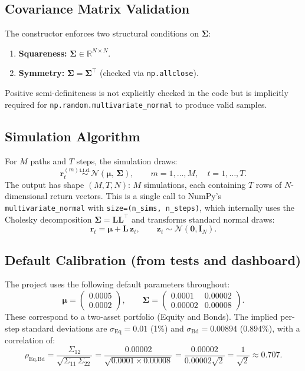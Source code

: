 \documentclass[12pt, a4paper]{article}
\begin{document}
\subsection{Covariance Matrix Validation}

The constructor enforces two structural conditions on $\bm{\Sigma}$:
\begin{enumerate}[noitemsep]
    \item \textbf{Squareness:} $\bm{\Sigma} \in \mathbb{R}^{N \times N}$.
    \item \textbf{Symmetry:} $\bm{\Sigma} = \bm{\Sigma}^\top$ (checked via
          \texttt{np.allclose}).
\end{enumerate}
Positive semi-definiteness is not explicitly checked in the code but is
implicitly required for \texttt{np.random.multivariate\_normal} to produce
valid samples.

\subsection{Simulation Algorithm}

For $M$ paths and $T$ steps, the simulation draws:
\begin{equation}
    \bm{r}^{(m)}_t \overset{\text{i.i.d.}}{\sim} \mathcal{N}(\bm{\mu},\,\bm{\Sigma}),
    \qquad m = 1,\ldots,M, \quad t = 1,\ldots,T.
\end{equation}
The output has shape $(M, T, N)$: $M$ simulations, each containing $T$ rows of
$N$-dimensional return vectors. This is a single call to NumPy's
\texttt{multivariate\_normal} with \texttt{size=(n\_sims, n\_steps)}, which
internally uses the Cholesky decomposition $\bm{\Sigma} = \bm{L}\bm{L}^\top$
and transforms standard normal draws:
\begin{equation}
    \bm{r}_t = \bm{\mu} + \bm{L}\, \bm{z}_t, \qquad \bm{z}_t \sim \mathcal{N}(\bm{0}, \bm{I}_N).
\end{equation}

\subsection{Default Calibration (from tests and dashboard)}

The project uses the following default parameters throughout:
\[
    \bm{\mu} = \begin{pmatrix} 0.0005 \\ 0.0002 \end{pmatrix}, \qquad
    \bm{\Sigma} = \begin{pmatrix} 0.0001 & 0.00002 \\ 0.00002 & 0.00008 \end{pmatrix}.
\]
These correspond to a two-asset portfolio (Equity and Bonds). The implied
per-step standard deviations are $\sigma_{\text{Eq}} = 0.01$ (1\%) and
$\sigma_{\text{Bd}} = 0.00894$ (0.894\%), with a correlation of:
\begin{equation}
    \rho_{\text{Eq,Bd}} = \frac{\Sigma_{12}}{\sqrt{\Sigma_{11}\,\Sigma_{22}}}
    = \frac{0.00002}{\sqrt{0.0001 \times 0.00008}}
    = \frac{0.00002}{0.00002\sqrt{2}}
    = \frac{1}{\sqrt{2}} \approx 0.707.
\end{equation}
\end{document}
